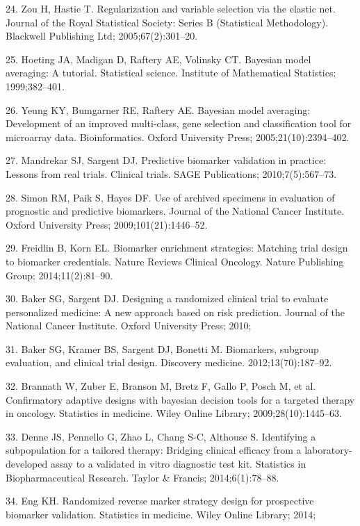 \documentclass[11pt]{article}
\begin{document}
24. Zou H, Hastie T. Regularization and variable selection via the
elastic net. Journal of the Royal Statistical Society: Series B
(Statistical Methodology). Blackwell Publishing Ltd; 2005;67(2):301--20.

25. Hoeting JA, Madigan D, Raftery AE, Volinsky CT. Bayesian model
averaging: A tutorial. Statistical science. Institute of Mathematical
Statistics; 1999;382--401.

26. Yeung KY, Bumgarner RE, Raftery AE. Bayesian model averaging:
Development of an improved multi-class, gene selection and
classification tool for microarray data. Bioinformatics. Oxford
University Press; 2005;21(10):2394--402.

27. Mandrekar SJ, Sargent DJ. Predictive biomarker validation in
practice: Lessons from real trials. Clinical trials. SAGE Publications;
2010;7(5):567--73.

28. Simon RM, Paik S, Hayes DF. Use of archived specimens in evaluation
of prognostic and predictive biomarkers. Journal of the National Cancer
Institute. Oxford University Press; 2009;101(21):1446--52.

29. Freidlin B, Korn EL. Biomarker enrichment strategies: Matching trial
design to biomarker credentials. Nature Reviews Clinical Oncology.
Nature Publishing Group; 2014;11(2):81--90.

30. Baker SG, Sargent DJ. Designing a randomized clinical trial to
evaluate personalized medicine: A new approach based on risk prediction.
Journal of the National Cancer Institute. Oxford University Press; 2010;

31. Baker SG, Kramer BS, Sargent DJ, Bonetti M. Biomarkers, subgroup
evaluation, and clinical trial design. Discovery medicine.
2012;13(70):187--92.

32. Brannath W, Zuber E, Branson M, Bretz F, Gallo P, Posch M, et al.
Confirmatory adaptive designs with bayesian decision tools for a
targeted therapy in oncology. Statistics in medicine. Wiley Online
Library; 2009;28(10):1445--63.

33. Denne JS, Pennello G, Zhao L, Chang S-C, Althouse S. Identifying a
subpopulation for a tailored therapy: Bridging clinical efficacy from a
laboratory-developed assay to a validated in vitro diagnostic test kit.
Statistics in Biopharmaceutical Research. Taylor \& Francis;
2014;6(1):78--88.

34. Eng KH. Randomized reverse marker strategy design for prospective
biomarker validation. Statistics in medicine. Wiley Online Library;
2014;
\end{document}
